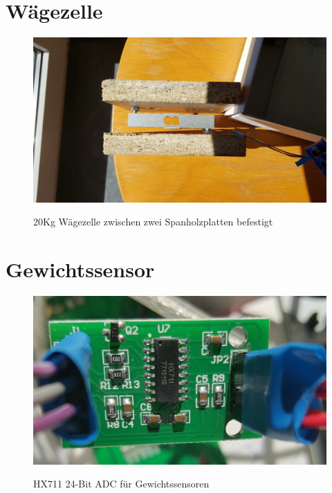 \section{Wägezelle}
\begin{figure}[ht]
    \center
    \includegraphics[width=15cm]{Bilder/waegezelle.jpg}\\
    \caption{20Kg Wägezelle zwischen zwei Spanholzplatten befestigt}
    \label{fig:Waegezelle}
\end{figure}
\newpage
\section{Gewichtssensor}
\begin{figure}[ht]
    \center
    \includegraphics[width=14cm]{Bilder/gewichtssensor.jpg}\\
    \caption{HX711 24-Bit ADC für Gewichtssensoren}
    \label{fig:Gewichtssensor}
\end{figure}
\newpage
